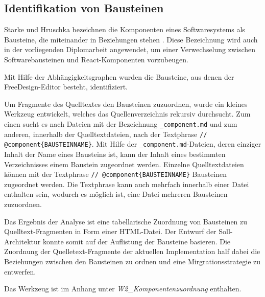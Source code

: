 

\subsection{Identifikation von Bausteinen}
Starke und Hruschka bezeichnen die Komponenten eines Softwaresystems als Bausteine, die miteinander in Beziehungen stehen \autocite[vgl.][24]{Starke2011}. Diese Bezeichnung wird auch in der vorliegenden Diplomarbeit angewendet, um einer Verwechselung zwischen Softwarebausteinen und React-Komponenten vorzubeugen.

Mit Hilfe der Abhängigkeitsgraphen wurden die Bausteine, aus denen der FreeDesign-Editor besteht, identifiziert. 

Um Fragmente des Quelltextes den Bausteinen zuzuordnen, wurde ein kleines Werkzeug entwickelt, welches das Quellenverzeichnis rekursiv durchsucht. Zum einen sucht es nach Dateien mit der Bezeichnung \glqq\lstinline|_component.md|\grqq{} und zum anderen, innerhalb der Quelltextdateien, nach der Textphrase \glqq\lstinline|// @component{BAUSTEINNAME}|\grqq{}. 
Mit Hilfe der \lstinline|_component.md|-Dateien, deren einziger Inhalt der Name eines Bausteins ist, kann der Inhalt eines bestimmten Verzeichnisses einem Baustein zugeordnet werden. Einzelne Quelltextdateien können mit der Textphrase \glqq\lstinline|// @component{BAUSTEINNAME}|\grqq{} Bausteinen zugeordnet werden. Die Textphrase kann auch mehrfach innerhalb einer Datei enthalten sein, wodurch es möglich ist, eine Datei mehreren Bausteinen zuzuordnen. 

Das Ergebnis der Analyse ist eine tabellarische Zuordnung von Bausteinen zu Quelltext-Fragmenten in Form einer HTML-Datei. 
Der Entwurf der Soll-Architektur konnte somit auf der Auflistung der Bausteine basieren. Die Zuordnung der Quelletext-Fragmente der aktuellen Implementation half dabei die Beziehungen zwischen den Bausteinen zu ordnen und eine Mirgrationsstrategie zu entwerfen.

Das Werkzeug ist im Anhang unter \emph{W2\_Komponentenzuordnung} enthalten.